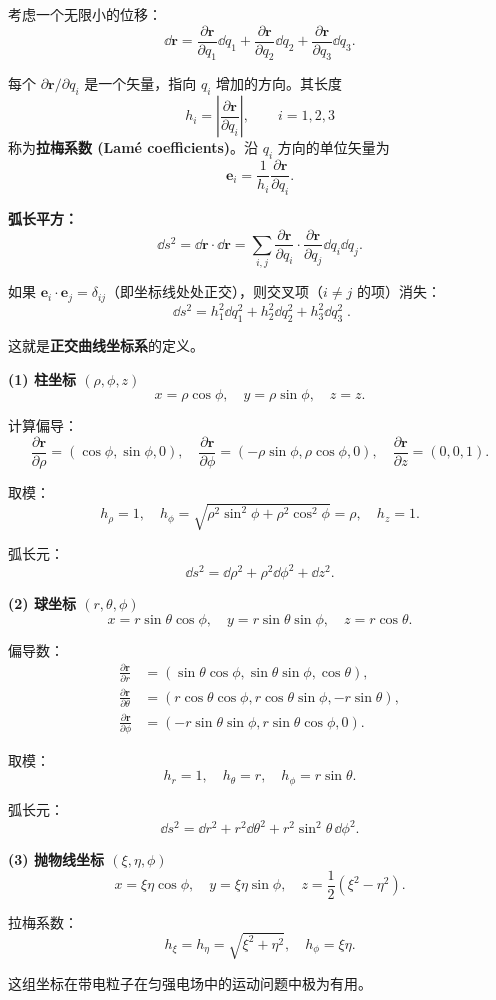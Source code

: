 考虑一个无限小的位移：
\[
\dd\mathbf{r} = \frac{\partial\mathbf{r}}{\partial q_1}\dd q_1
+ \frac{\partial\mathbf{r}}{\partial q_2}\dd q_2
+ \frac{\partial\mathbf{r}}{\partial q_3}\dd q_3 .
\]

每个 $\partial\mathbf{r}/\partial q_i$ 是一个矢量，指向 $q_i$ 增加的方向。其长度
\[
h_i = \left|\frac{\partial\mathbf{r}}{\partial q_i}\right|,\qquad i=1,2,3
\]
称为\textbf{拉梅系数 (Lamé coefficients)}。沿 $q_i$ 方向的单位矢量为
\[
\mathbf{e}_i = \frac{1}{h_i}\frac{\partial\mathbf{r}}{\partial q_i}.
\]

\textbf{弧长平方：}
\[
\dd s^2 = \dd\mathbf{r}\cdot\dd\mathbf{r}
= \sum_{i,j} \frac{\partial\mathbf{r}}{\partial q_i}\cdot\frac{\partial\mathbf{r}}{\partial q_j}\dd q_i\dd q_j .
\]

如果 $\mathbf{e}_i\cdot\mathbf{e}_j = \delta_{ij}$（即坐标线处处正交），则交叉项（$i\neq j$ 的项）消失：
\[
\boxed{\;\dd s^2 = h_1^2\dd q_1^2 + h_2^2\dd q_2^2 + h_3^2\dd q_3^2\;}.
\label{eq:metric_line_element}
\]

这就是\textbf{正交曲线坐标系}的定义。

\begin{example}
\textbf{(1) 柱坐标 $(\rho,\phi,z)$}
\[
x = \rho\cos\phi,\quad y = \rho\sin\phi,\quad z = z.
\]

计算偏导：
\[
\frac{\partial\mathbf{r}}{\partial\rho} = (\cos\phi,\sin\phi,0),\quad
\frac{\partial\mathbf{r}}{\partial\phi} = (-\rho\sin\phi,\rho\cos\phi,0),\quad
\frac{\partial\mathbf{r}}{\partial z} = (0,0,1).
\]

取模：
\[
h_\rho = 1,\quad h_\phi = \sqrt{\rho^2\sin^2\phi+\rho^2\cos^2\phi} = \rho,\quad h_z = 1.
\]

弧长元：
\[
\dd s^2 = \dd\rho^2 + \rho^2\dd\phi^2 + \dd z^2.
\]

\textbf{(2) 球坐标 $(r,\theta,\phi)$}
\[
x = r\sin\theta\cos\phi,\quad y = r\sin\theta\sin\phi,\quad z = r\cos\theta.
\]

偏导数：
\begin{align*}
\frac{\partial\mathbf{r}}{\partial r} &= (\sin\theta\cos\phi,\sin\theta\sin\phi,\cos\theta),\\
\frac{\partial\mathbf{r}}{\partial\theta} &= (r\cos\theta\cos\phi,r\cos\theta\sin\phi,-r\sin\theta),\\
\frac{\partial\mathbf{r}}{\partial\phi} &= (-r\sin\theta\sin\phi,r\sin\theta\cos\phi,0).
\end{align*}

取模：
\[
h_r = 1,\quad h_\theta = r,\quad h_\phi = r\sin\theta.
\]

弧长元：
\[
\dd s^2 = \dd r^2 + r^2\dd\theta^2 + r^2\sin^2\theta\,\dd\phi^2.
\]

\textbf{(3) 抛物线坐标 $(\xi,\eta,\phi)$}
\[
x = \xi\eta\cos\phi,\quad y = \xi\eta\sin\phi,\quad z = \frac12(\xi^2-\eta^2).
\]

拉梅系数：
\[
h_\xi = h_\eta = \sqrt{\xi^2+\eta^2},\quad h_\phi = \xi\eta.
\]

这组坐标在带电粒子在匀强电场中的运动问题中极为有用。
\end{example}

